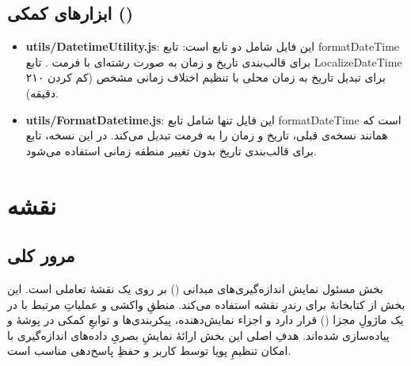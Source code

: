     \subsection{ابزارهای کمکی ()}
    \begin{itemize}
    	\item \textbf{utils/DatetimeUtility.js}:
    	این فایل شامل دو تابع است:
    	تابع formatDateTime برای قالب‌بندی تاریخ و زمان به صورت رشته‌ای با فرمت .
    	تابع LocalizeDateTime برای تبدیل تاریخ به زمان محلی با تنظیم اختلاف زمانی مشخص (کم کردن ۲۱۰ دقیقه).
    	
    	\item \textbf{utils/FormatDatetime.js}:
    	این فایل تنها شامل تابع formatDateTime است که همانند نسخه‌ی قبلی، تاریخ و زمان را به فرمت  تبدیل می‌کند.
    	در این نسخه، تابع برای قالب‌بندی تاریخ بدون تغییر منطقه زمانی استفاده می‌شود.
    	
    	
    \end{itemize}
    
\section{نقشه}
\label{sec:map}

\subsection{مرور کلی}
بخش  مسئول نمایش اندازه‌گیری‌های میدانی () بر روی یک نقشهٔ تعاملی است. این بخش از کتابخانهٔ  برای رندرِ نقشه استفاده می‌کند. منطقِ واکشی و عملیاتِ مرتبط با  در یک ماژولِ مجزا () قرار دارد و اجزاء نمایش‌دهنده، پیکربندی‌ها و توابعِ کمکی در پوشهٔ  و  پیاده‌سازی شده‌اند. هدفِ اصلی این بخش ارائهٔ نمایشِ بصریِ داده‌های اندازه‌گیری با امکان تنظیمِ پویا توسط کاربر و حفظِ پاسخ‌دهی مناسب است.

